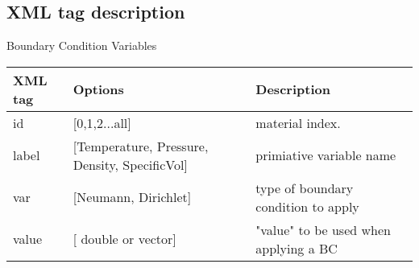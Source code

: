 \documentclass[fleqn,10pt]{article}
\begin{document}
\subsection{XML tag description}


\begin{center}
Boundary Condition Variables
\begin{tabular}{l p{7cm} p{7cm}}
\small{XML tag} & \small{Options}& \small{Description}\\
\hline
\hline
id          &  [0,1,2...all]                                   &   material index.\\
label       & [Temperature, Pressure, Density, SpecificVol]    &   primiative variable name\\
var         & [Neumann, Dirichlet]                             &   type of boundary condition to apply \\
value       & [ double or vector]                              &   "value" to be used when applying a BC\\
\hline
\end{tabular}
\end{center}
\end{document}
